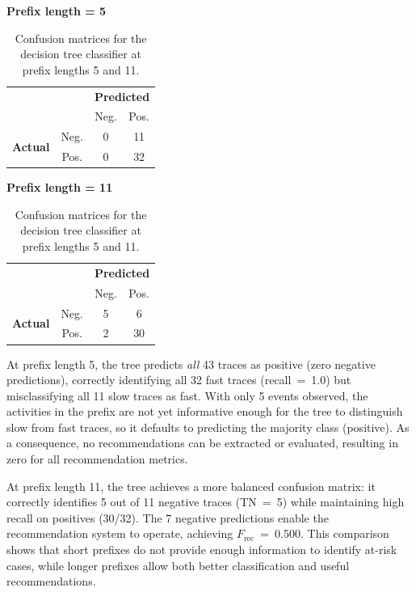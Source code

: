 \documentclass{article}
\begin{document}
\begin{table}[H]
\centering
\caption{Confusion matrices for the decision tree classifier at prefix lengths 5 and 11.}
\label{tab:cm-5-vs-11}
\begin{minipage}[t]{0.45\textwidth}
\centering
\textbf{Prefix length = 5}

\medskip
\begin{tabular}{cc|c|c|}
& \multicolumn{1}{c}{} & \multicolumn{2}{c}{\textbf{Predicted}} \\
& \multicolumn{1}{c}{} & \multicolumn{1}{c}{Neg.}  & \multicolumn{1}{c}{Pos.} \\\cline{3-4}
\multirow{2}{*}{\textbf{Actual}} & Neg. & 0 & 11 \\\cline{3-4}
                        & Pos. & 0 & 32 \\\cline{3-4}
\end{tabular}
\end{minipage}
\hfill
\begin{minipage}[t]{0.45\textwidth}
\centering
\textbf{Prefix length = 11}

\medskip
\begin{tabular}{cc|c|c|}
& \multicolumn{1}{c}{} & \multicolumn{2}{c}{\textbf{Predicted}} \\
& \multicolumn{1}{c}{} & \multicolumn{1}{c}{Neg.}  & \multicolumn{1}{c}{Pos.} \\\cline{3-4}
\multirow{2}{*}{\textbf{Actual}} & Neg. & 5 & 6 \\\cline{3-4}
                        & Pos. & 2 & 30 \\\cline{3-4}
\end{tabular}
\end{minipage}
\end{table}

\noindent
At prefix length 5, the tree predicts \textit{all} 43 traces as positive (zero negative predictions), correctly identifying all 32 fast traces (recall~=~1.0) but misclassifying all 11 slow traces as fast. With only 5 events observed, the activities in the prefix are not yet informative enough for the tree to distinguish slow from fast traces, so it defaults to predicting the majority class (positive). As a consequence, no recommendations can be extracted or evaluated, resulting in zero for all recommendation metrics.

\medskip
\noindent
At prefix length 11, the tree achieves a more balanced confusion matrix: it correctly identifies 5 out of 11 negative traces (TN~=~5) while maintaining high recall on positives (30/32). The 7 negative predictions enable the recommendation system to operate, achieving $F_{\text{rec}}$~=~0.500. This comparison shows that short prefixes do not provide enough information to identify at-risk cases, while longer prefixes allow both better classification and useful recommendations.
\end{document}
